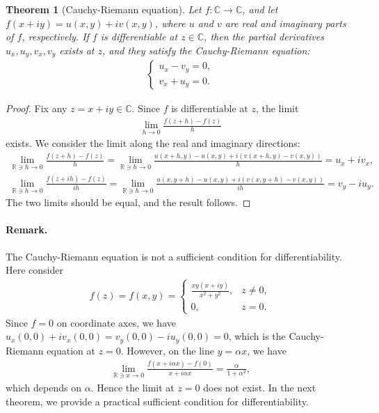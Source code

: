 \documentclass{article}
\numberwithin{equation}{section}
\newcommand{\bbC}{\mathbb{C}}
\newcommand{\bbR}{\mathbb{R}}
\theoremstyle{plain}
\newtheorem{theorem}{Theorem}[section]
\theoremstyle{definition}
\begin{document}
\begin{theorem}[Cauchy-Riemann equation]
Let $f:\bbC\to\bbC$, and let $f(x+iy)=u(x,y)+iv(x,y)$, where $u$ and $v$ are real and imaginary parts of $f$, respectively. If $f$ is differentiable at $z\in\bbC$, then the partial derivatives $u_x,u_y,v_x,v_y$ exists at $z$, and they satisfy the Cauchy-Riemann equation:
\begin{align}
\begin{cases}
	u_x-v_y=0,\\
	v_x+u_y=0.
\end{cases}\label{cauchyriemann}
\end{align}
\end{theorem}
\begin{proof}
Fix any $z=x+iy\in\bbC$. Since $f$ is differentiable at $z$, the limit
\begin{align*}
	\lim_{h\to 0}\frac{f(z+h)-f(z)}{h}
\end{align*}
exists. We consider the limit along the real and imaginary directions:
\begin{align*}
	\lim_{\bbR\ni h\to 0}\frac{f(z+h)-f(z)}{h}=\lim_{\bbR\ni h\to 0}\frac{u(x+h,y)-u(x,y)+i\left(v(x+h,y)-v(x,y)\right)}{h}=u_x+iv_x,\\
	\lim_{\bbR\ni h\to 0}\frac{f(z+ih)-f(z)}{ih}=\lim_{\bbR\ni h\to 0}\frac{u(x,y+h)-u(x,y)+i\left(v(x,y+h)-v(x,y)\right)}{ih}=v_y-iu_y.
\end{align*}
The two limits should be equal, and the result follows.
\end{proof}

\paragraph{Remark.} The Cauchy-Riemann equation is not a sufficient condition for differentiability. Here consider
\begin{align*}
	f(z)=f(x,y)=\begin{cases}
		\displaystyle\frac{xy(x+iy)}{x^2+y^2}, &z\neq 0,\\
		0, &z=0.
	\end{cases}
\end{align*}
Since $f=0$ on coordinate axes, we have $u_x(0,0)+iv_x(0,0)=v_y(0,0)-iu_y(0,0)=0$, which is the Cauchy-Riemann equation at $z=0$. However, on the line $y=\alpha x$, we have
\begin{align*}
	\lim_{\bbR\ni x\to 0}\frac{f(x+i\alpha x)-f(0)}{x+i\alpha x}=\frac{\alpha}{1+\alpha^2},
\end{align*}
which depends on $\alpha$. Hence the limit at $z=0$ does not exist. In the next theorem, we provide a practical sufficient condition for differentiability.
\end{document}
